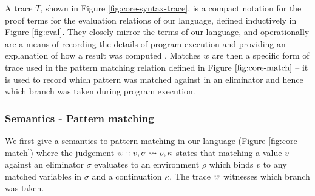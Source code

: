 

A trace $T$, shown in Figure \ref{fig:core-syntax-trace}, is a compact notation for the proof terms for the evaluation relations of our language, defined inductively in Figure \ref{fig:eval}. 
They closely mirror the terms of our language, and operationally are a means of recording the details of program execution and providing an explanation of how a result was computed \cite{perera12a}. Matches $w$ are then a specific form of trace used in the pattern matching relation defined in Figure $\ref{fig:core-match}$ -- it is used to record which pattern was matched against in an eliminator and hence which branch was taken during program execution. 





\subsubsection{Semantics - Pattern matching}
\label{ssec:core-semantics-match}


We first give a semantics to pattern matching in our language (Figure \ref{fig:core-match}) where the judgement $\explVal{w}{v, \sigma \matchR \rho, \kappa}$ states that matching a value $v$ against an eliminator $\sigma$ evaluates to an environment $\rho$ which binds $v$ to any matched variables in $\sigma$ and a continuation $\kappa$. The trace $\textcolor{gray}{w}$ witnesses which branch was taken.


